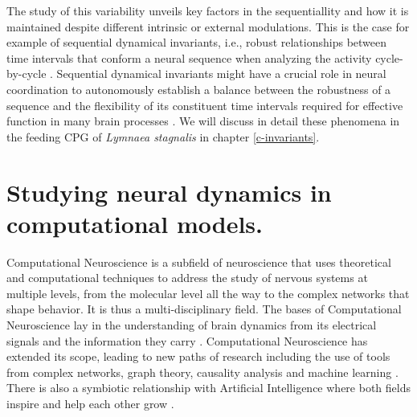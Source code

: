 The study of this variability unveils key factors in the sequentiallity and how it is maintained despite different intrinsic or external modulations. This is the case for example of sequential dynamical invariants, i.e., robust relationships between time intervals that conform a neural sequence when analyzing the activity cycle-by-cycle \parencite{reyes_artificial_2008,elices_robust_2019,garrido-pena_characterization_2021,berbel_emergence_2024}. Sequential dynamical invariants might have a crucial role in neural coordination to autonomously establish a balance between the robustness of a sequence and the flexibility of its constituent time intervals required for effective function in many brain processes \parencite{tatsuno_analysis_2015,ullen_neural_2003,zimnik_independent_2021,zhou_neural_2020,dragoi_cell_2020}. We will discuss in detail these phenomena in the feeding CPG of \textit{Lymnaea stagnalis} in chapter \ref{c-invariants}.


\section{Studying neural dynamics in computational models.}
\label{sec:computational neuroscience}
Computational Neuroscience is a subfield of neuroscience that uses theoretical and computational techniques to address the study of nervous systems at multiple levels, from the molecular level all the way to the complex networks that shape behavior. It is thus a multi-disciplinary field. The bases of Computational Neuroscience lay in the understanding of brain dynamics from its electrical signals and the information they carry \parencite{hodgkin_quantitative_1952,schwiening_brief_2012,catterall_hodgkinhuxley_2012,dimitrov_information_2011,shannon_mathematical_1948}. Computational Neuroscience has extended its scope, leading to new paths of research including the use of tools from complex networks, graph theory, causality analysis and machine learning \parencite{cns2023}. There is also a symbiotic relationship with Artificial Intelligence  where both fields inspire and help each other grow \parencite{amunts_human_2019,wozniak_deep_2020,goncalves_training_2020}.

